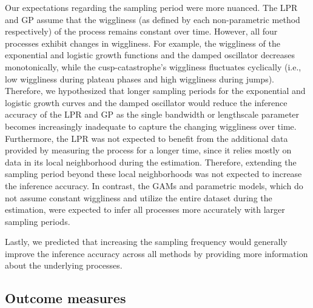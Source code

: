 \documentclass[man, floatsintext]{apa7}
\begin{document}
Our expectations regarding the sampling period were more nuanced. The LPR and
GP assume that the wiggliness (as defined by each non-parametric method
respectively) of the process remains constant over time. However, all four
processes exhibit changes in wiggliness. For example, the wiggliness of the
exponential and logistic growth functions and the damped oscillator decreases
monotonically, while the cusp-catastrophe's wiggliness fluctuates cyclically
(i.e., low wiggliness during plateau phases and high wiggliness during jumps).
Therefore, we hypothesized that longer sampling periods for the exponential and
logistic growth curves and the damped oscillator would reduce the inference
accuracy of the LPR and GP as the single bandwidth or lengthscale parameter
becomes increasingly inadequate to capture the changing wiggliness over time.
Furthermore, the LPR was not expected to benefit from the additional
data provided by measuring the process for a longer time, since it relies
mostly on data in its local neighborhood during the estimation. Therefore,
extending the sampling period beyond these local neighborhoods was not expected
to increase the inference accuracy. In contrast, the GAMs and parametric
models, which do not assume constant wiggliness and utilize the entire dataset
during the estimation, were expected to infer all processes more accurately
with larger sampling periods.

Lastly, we predicted that increasing the sampling frequency would generally
improve the inference accuracy across all methods by providing more information
about the underlying processes.

\subsection{Outcome measures}
\end{document}

